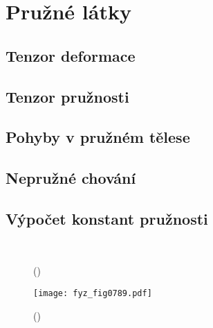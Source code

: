 \setchaptertoc
\chapter{Pružné látky}\label{fyz:IIchapIXL}

  \section{Tenzor deformace}\label{fyz:IIchapIXLsecI}
  \section{Tenzor pružnosti}\label{fyz:IIchapIXLsecII}
  \section{Pohyby v pružném tělese}\label{fyz:IIchapIXLsecIII}
  \section{Nepružné chování}\label{fyz:IIchapIXLsecIV}
  \section{Výpočet konstant pružnosti}\label{fyz:IIchapIXLsecV}

    \begin{figure}[ht!]
      \centering
                     \\
      \label{fyz:fig0788}
      \caption{
               (\cite[s.~748]{Feynman02})}
    \end{figure}

    \begin{figure}[ht!] %
      \centering
      \texttt{[image: fyz\_fig0789.pdf]}
      \caption{
               (\cite[s.~707]{Feynman02})}
      \label{fyz:fig0789}
    \end{figure}

